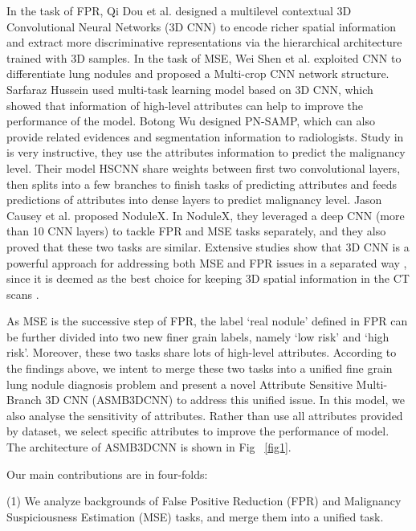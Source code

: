 \documentclass[runningheads]{llncs}
\begin{document}
In the task of FPR, Qi Dou et al. \cite{Qi2016Multilevel} designed a multilevel contextual 3D Convolutional Neural Networks (3D CNN) to encode richer spatial information and extract more discriminative representations via the hierarchical architecture trained with 3D samples.
In the task of MSE, Wei Shen et al. \cite{Shen2017Multi} exploited CNN to differentiate lung nodules and proposed a Multi-crop CNN network structure. Sarfaraz Hussein \cite{Hussein2017Risk} used multi-task learning model based on 3D CNN, which showed that information of high-level attributes can help to improve the performance of the model. Botong Wu \cite{Wu2018Joint} designed PN-SAMP, which can also provide related evidences and segmentation information to radiologists.
Study in \cite{shen2019interpretable} is very instructive, they  use the attributes information to predict the malignancy level. Their model HSCNN share weights between first two convolutional layers, then splits into a few branches to finish tasks of predicting attributes and  feeds predictions of attributes into  dense layers to predict malignancy level.
Jason Causey et al. \cite{Causey2018Highly} proposed NoduleX. In NoduleX, they leveraged a deep CNN (more than 10 CNN layers) to tackle FPR and MSE tasks separately, and they also proved that these two tasks are similar.
Extensive studies show that 3D CNN is a powerful approach for addressing both MSE and FPR issues in a separated way \cite{Qi2016Multilevel}\cite{Causey2018Highly}\cite{Shen2015Multi}\cite{Kang20173D}, since it is deemed as the best choice for keeping 3D spatial information in the CT scans \cite{Yorozu1987Electron}.

As MSE is the successive step of FPR, the label `real nodule' defined in FPR can be further divided into two new finer grain labels, namely `low risk' and `high risk'. Moreover, these two tasks share lots of high-level attributes. According to the findings above, we intent to merge these two tasks into a unified fine grain lung nodule diagnosis problem and present a novel Attribute Sensitive Multi-Branch 3D CNN (ASMB3DCNN) to address this unified issue. In this model, we also analyse the sensitivity of attributes. Rather than use all attributes provided by dataset, we select specific attributes to improve the performance of model. 
The architecture of ASMB3DCNN is shown in Fig ~\ref{fig1}.


Our main contributions are in four-folds:

(1) We analyze backgrounds of False Positive Reduction (FPR) and  Malignancy Suspiciousness Estimation (MSE) tasks, and merge them into a unified task.
\end{document}
